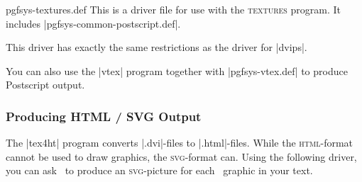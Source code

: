 \begin{filedescription}{pgfsys-textures.def}
  This is a driver file for use with the \textsc{textures} program. It
  includes |pgfsys-common-postscript.def|.

  This driver has exactly the same restrictions as the driver for
  |dvips|.
\end{filedescription}

You can also use the |vtex| program together with |pgfsys-vtex.def| to
produce Postscript output.



\subsubsection{Producing HTML / SVG Output}

The |tex4ht| program converts |.dvi|-files to |.html|-files. While the
\textsc{html}-format cannot be used to draw graphics, the
\textsc{svg}-format can. Using the following driver, you can ask
\pgfname\ to produce an \textsc{svg}-picture for each \pgfname\
graphic in your text.

